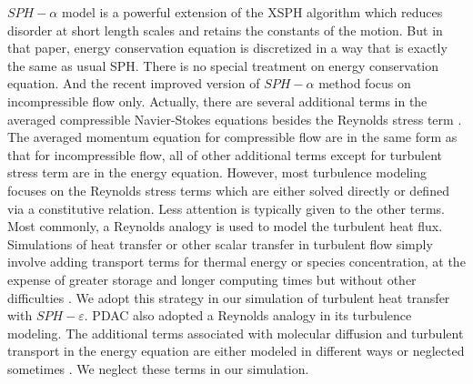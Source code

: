 \documentclass[journal abbreviation, manuscript]{copernicus}
\begin{document}
$SPH-\alpha$ model \citep{monaghan2002sph} is a powerful extension of the XSPH algorithm which reduces disorder at short length scales and retains the constants of the motion. But in that paper, energy conservation equation is discretized in a way that is exactly the same as usual SPH. There is no special treatment on energy conservation equation. And the recent improved version \citep{monaghan2011turbulence} of $SPH-\alpha$ method focus on incompressible flow only. Actually, there are several additional terms in the averaged compressible Navier-Stokes equations besides the Reynolds stress term \citep{NASACompressibleTurbulence}. The averaged momentum equation for compressible flow are in the same form as that for incompressible flow, all of other additional terms except for turbulent stress term are in the energy equation. However, most turbulence modeling focuses on the Reynolds stress terms which are either solved directly or defined via a constitutive relation. Less attention is typically given to the other terms. Most commonly, a Reynolds analogy is used to model the turbulent heat flux. Simulations of heat transfer or other scalar transfer in turbulent flow simply involve adding transport terms for thermal energy or species concentration, at the expense of greater storage and longer computing times but without other difficulties \citep{cebeci2013analysis}. We adopt this strategy in our simulation of turbulent heat transfer with $SPH-\varepsilon$. PDAC \citep{neri2003multiparticle} also adopted a Reynolds analogy in its turbulence modeling. The additional terms associated with molecular diffusion and turbulent transport in the energy equation are either modeled in different ways or neglected sometimes \citep{NASACompressibleTurbulence}. We neglect these terms in our simulation.\\
\end{document}
